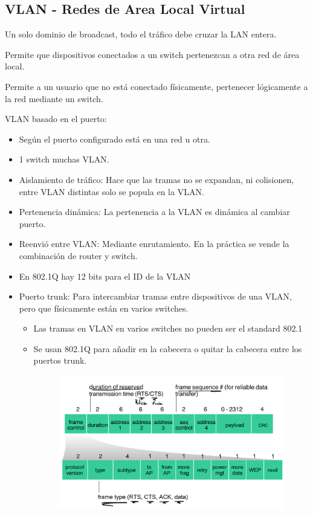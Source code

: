 \documentclass[12pt, twoside, openright]{report} %
\begin{document}
\subsection{VLAN - Redes de Area Local Virtual}

  

      Un solo dominio de broadcast, todo el tráfico debe cruzar la LAN
      entera.

      Permite que dispositivos conectados a un switch pertenezcan a otra
      red de área local.

      Permite a un usuario que no está conectado físicamente, pertenecer
      lógicamente a la red mediante un switch.

      VLAN basado en el puerto:

      \begin{itemize}
      \item
        Según el puerto configurado está en una red u otra.
      \item
        1 switch muchas VLAN.
      \item
        Aislamiento de tráfico: Hace que las tramas no se expandan, ni
        colisionen, entre VLAN distintas solo se popula en la VLAN.
      \item
        Pertenencia dinámica: La pertenencia a la VLAN es dinámica al
        cambiar puerto.
      \item
        Reenvió entre VLAN: Mediante enrutamiento. En la práctica se
        vende la combinación de router y switch.
      \item
        En 802.1Q hay 12 bits para el ID de la VLAN
      \item
        Puerto trunk: Para intercambiar tramas entre dispositivos de una
        VLAN, pero que físicamente están en varios switches.
        \begin{itemize}
          \item Las tramas en VLAN en varios switches no pueden ser el standard
          802.1 
          \item Se usan 802.1Q para añadir en la cabecera o quitar la
          cabecera entre los puertos trunk.
          \begin{figure}[H]
            {\includegraphics[scale=.25]{Untitled 63.png}}
          \end{figure}
        \end{itemize}
      \end{itemize}
 
\end{document}
